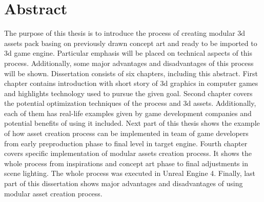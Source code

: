
\chapter*{Abstract}

The purpose of this thesis is to introduce the process of creating modular 3d assets pack basing on previously drawn concept art and ready to be imported to 3d game engine. Particular emphasis will be placed on technical aspects of this process. Additionally, some major advantages and disadvantages of this process will be shown. \newline
Dissertation consists of six chapters, including this abstract.\newline\indent
First chapter contains introduction with short story of 3d graphics in computer games and highlights technology used to pursue the given goal.\newline\indent
Second chapter covers the potential optimization techniques of the process and 3d assets. Additionally, each of them has real-life examples given by game development companies and potential benefits of using it included. \newline\indent
Next part of this thesis shows the example of how asset creation process can be implemented in team of game developers from early preproduction phase to final level in target engine. \newline\indent
Fourth chapter covers specific implementation of modular assets creation process. It shows the whole process from inspirations and concept art phase to final adjustments in scene lighting. The whole process was executed in Unreal Engine 4. \newline\indent
Finally, last part of this dissertation shows major advantages and disadvantages of using modular asset creation process. 